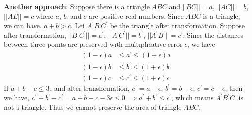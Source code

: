 \noindent\textbf{Another approach: }
Suppose there is a triangle $ABC$ and $||BC||=a$, $||AC||=b$, $||AB||=c$ where $a$, $b$, and $c$ are positive real numbers.
Since $ABC$ is a triangle, we can have, $a+b>c$.
Let $A^{\prime}B^{\prime}C^{\prime}$ be the triangle after transformation.
Suppose after transformation,  $||B^\prime C^\prime ||=a^\prime$, $||A^\prime C^\prime ||=b^\prime$, $||A^\prime B^\prime ||=c^\prime$. 
Since the distances between three points are preserved with multiplicative error $\epsilon$, we have
\begin{align}
    \nonumber (1-\epsilon)a &\le a^{\prime}\le (1+\epsilon)a\\
    \nonumber (1-\epsilon)b &\le b^{\prime}\le (1+\epsilon)b\\
    \nonumber (1-\epsilon)c &\le c^{\prime}\le (1+\epsilon)c
\end{align} 
If $a+b-c \le 3\epsilon$ and after transformation, $a^{\prime}=a-\epsilon$, $b^{\prime}=b-\epsilon$, $c^{\prime}=c+\epsilon$,
then we have,
$a^\prime+b^\prime-c^\prime=a+b-c-3\epsilon \le 0 \implies a^\prime+b^\prime\le c^\prime$, which means $A^{\prime}B^{\prime}C^{\prime}$ is not a triangle.
Thus we cannot preserve the area of triangle $ABC$.


